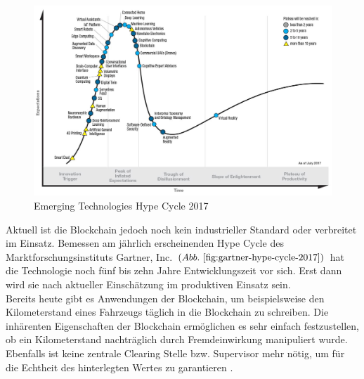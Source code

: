 \begin{figure}[h!]
	\centering
	\includegraphics[width=0.68\linewidth]{pictures/Gartner-Hype-Cycle-2017}
	\caption[Gartner Hype Cycle 2017]{Emerging Technologies Hype Cycle 2017\citep{Gartner2017}}
	\label{fig:gartner-hype-cycle-2017}
\end{figure}

Aktuell ist die Blockchain jedoch noch kein industrieller Standard oder verbreitet im Einsatz. Bemessen am jährlich erscheinenden Hype Cycle des Marktforschungsinstituts Gartner, Inc. $( Abb.~ \ref{fig:gartner-hype-cycle-2017} )$ hat die Technologie noch fünf bis zehn Jahre Entwicklungszeit vor sich. Erst dann wird sie nach aktueller Einschätzung im produktiven Einsatz sein.\\

Bereits heute gibt es Anwendungen der Blockchain, um beispielsweise den Kilometerstand eines Fahrzeugs täglich \glqq in die Blockchain\grqq{} zu schreiben. Die inhärenten Eigenschaften der Blockchain ermöglichen es sehr einfach festzustellen, ob ein Kilometerstand nachträglich durch Fremdeinwirkung manipuliert wurde. Ebenfalls ist keine zentrale \glqq Clearing Stelle\grqq{} bzw. Supervisor mehr nötig, um für die Echtheit des hinterlegten Wertes zu garantieren \citep{carVertical}.\\


